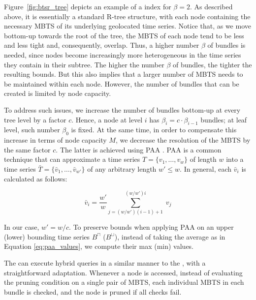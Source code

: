 Figure~\ref{fig:btsr_tree} depicts an example of a \btsr index for $\beta=2$. As described above, it is essentially a standard R-tree structure, with each node containing the necessary MBTS of its underlying geolocated time series. Notice that, as we move bottom-up towards the root of the tree, the MBTS of each node tend to be less and less tight and, consequently, overlap. Thus, a higher number $\beta$ of bundles is needed, since nodes become increasingly more heterogeneous in the time series they contain in their subtree. The higher the number $\beta$ of bundles, the tighter the resulting bounds. But this also implies that a larger number of MBTS needs to be maintained within each node. However, the number of bundles that can be created is limited by node capacity.

To address such issues, we increase the number of bundles bottom-up at every tree level by a factor $c$. Hence, a node at level $i$ has $\beta_{i} = c \cdot \beta_{i-1}$ bundles; at leaf level, such number $\beta_0$ is fixed. At the same time, in order to compensate this increase in terms of node capacity $M$, we decrease the resolution of the MBTS by the same factor $c$. The latter is achieved using PAA \cite{keogh2001paa,faloutsos2000vldb}. PAA is a common technique that can approximate a time series $T = \{v_1, \ldots, v_w\}$ of length $w$ into a time series $\bar{T} = \{\bar{v}_1, \ldots, \bar{v}_{w'}\}$ of any arbitrary length $w' \leq w$. In general, each $\bar{v}_i$ is calculated as follows:

\begin{equation}
 \bar{v}_i = \frac{w'}{w} \sum_{j = (w/w')(i-1)+1}^{(w/w')i} \; v_j
 \label{eq:paa_values}
\end{equation}

In our case, $w' = w / c$. To preserve bounds when applying PAA on an upper (lower) bounding time series $B^{\sqcap}$ ($B^{\sqcup}$), instead of taking the average as in Equation \ref{eq:paa_values}, we compute their max (min) values.

The \btsr can execute hybrid queries in a similar manner to the \tsr, with a straightforward adaptation. Whenever a node is accessed, instead of evaluating the pruning condition on a single pair of MBTS, each individual MBTS in each bundle is checked, and the node is pruned if all checks fail.